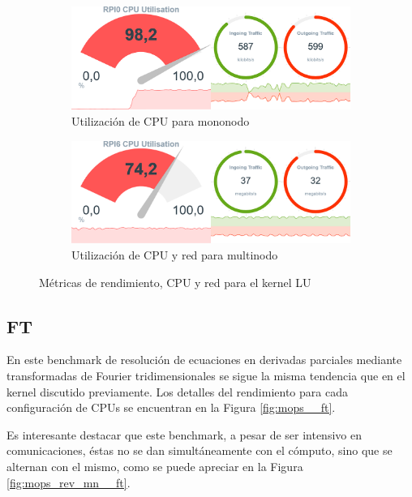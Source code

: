 \begin{figure}[h!]
    \begin{subfigure}[c]{0.75\textwidth}
        \includegraphics[width=\textwidth]{img/benchmark_rev/lu_rev_sn.png}
        \caption{Utilización de CPU para mononodo}
        \label{fig:mops_rev_sn__lu}
    \end{subfigure}

    \vspace{0.5cm}
    
    \begin{subfigure}[c]{0.75\textwidth}
        \includegraphics[width=\textwidth]{img/benchmark_rev/lu_rev_mn.png}
        \caption{Utilización de CPU y red para multinodo}
        \label{fig:mops_rev_mn__lu}
    \end{subfigure}
    \caption{Métricas de rendimiento, CPU y red para el kernel LU}
    \label{fig:mops__lu}
\end{figure}

\subsection{FT}
\label{ssec:comparacion_resultados__ft}
En este benchmark de resolución de ecuaciones en derivadas parciales mediante transformadas de Fourier tridimensionales se sigue la misma tendencia que en el kernel discutido previamente. Los detalles del rendimiento para cada configuración de CPUs se encuentran en la Figura \ref{fig:mops__ft}. 

Es interesante destacar que este benchmark, a pesar de ser intensivo en comunicaciones, éstas no se dan simultáneamente con el cómputo, sino que se alternan con el mismo, como se puede apreciar en la Figura \ref{fig:mops_rev_mn__ft}.

